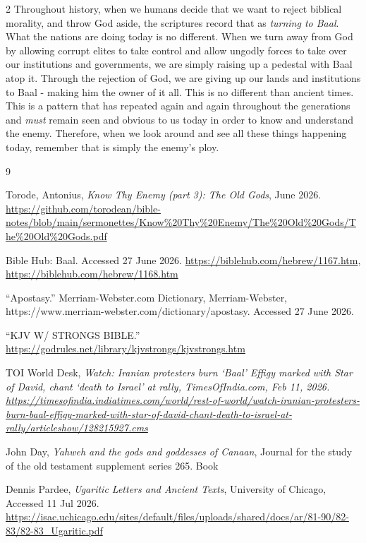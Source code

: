 \documentclass[10pt]{article}
\begin{document}
\begin{multicols}{2}
Throughout history, when we humans decide that we want to reject biblical morality, and throw God aside, the scriptures record that as \textit{turning to Baal}. What the nations are doing today is no different. When we turn away from God by allowing corrupt elites to take control and allow ungodly forces to take over our institutions and governments, we are simply  raising up a pedestal with Baal atop it. Through the rejection of God, we are giving up our lands and institutions to Baal - making him the owner of it all. This is no different than ancient times. This is a pattern that has repeated again and again throughout the generations and \textit{must} remain seen and obvious to us today in order to know and understand the enemy. Therefore, when we look around and see all these things happening today, remember that is simply the enemy's ploy.




\begin{thebibliography}{9}
{\footnotesize
	
	 Torode, Antonius, \textit{Know Thy Enemy (part 3): The Old Gods}, June 2026.  \url{https://github.com/torodean/bible-notes/blob/main/sermonettes/Know%20Thy%20Enemy/The%20Old%20Gods/The%20Old%20Gods.pdf}
	
	 Bible Hub: Baal. Accessed 27 June 2026. \url{https://biblehub.com/hebrew/1167.htm}, \url{https://biblehub.com/hebrew/1168.htm}
	
	 “Apostasy.” Merriam-Webster.com Dictionary, Merriam-Webster, https://www.merriam-webster.com/dictionary/apostasy. Accessed 27 June 2026.
	
	 ``KJV W/ STRONGS BIBLE.'' \url{https://godrules.net/library/kjvstrongs/kjvstrongs.htm}
			
	 TOI World Desk, \textit{Watch: Iranian protesters burn `Baal' Effigy marked with Star of David, chant `death to Israel' at rally, TimesOfIndia.com, Feb 11, 2026. \url{https://timesofindia.indiatimes.com/world/rest-of-world/watch-iranian-protesters-burn-baal-effigy-marked-with-star-of-david-chant-death-to-israel-at-rally/articleshow/128215927.cms}}
	
	 John Day, \textit{Yahweh and the gods and goddesses of Canaan}, Journal for the study of the old testament supplement series 265. Book
		
	 Dennis Pardee, \textit{Ugaritic Letters and Ancient Texts}, University of Chicago, Accessed 11 Jul 2026. \url{https://isac.uchicago.edu/sites/default/files/uploads/shared/docs/ar/81-90/82-83/82-83_Ugaritic.pdf}
	
}
\end{thebibliography}
\end{multicols}
\end{document}
